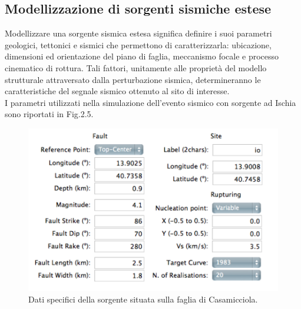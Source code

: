 \documentclass[a4paper,12pt,titlepage]{article}
\begin{document}
\subsection{Modellizzazione di sorgenti sismiche estese}

Modellizzare una sorgente sismica estesa significa definire i suoi parametri geologici, tettonici e sismici che permettono di caratterizzarla: ubicazione, dimensioni ed orientazione del piano di faglia, meccanismo focale e processo cinematico di rottura. Tali fattori, unitamente alle proprietà del modello strutturale attraversato dalla perturbazione sismica, determineranno le caratteristiche del segnale sismico ottenuto al sito di interesse.\\
I parametri utilizzati nella simulazione dell'evento sismico con sorgente ad Ischia sono riportati in Fig.2.5.

\begin{figure}[htbp]
 \centering
 \includegraphics[width=.5\linewidth]{Img/Paratmeters.png}
 \caption{Dati specifici della sorgente situata sulla faglia di Casamicciola.}
 \label{fig:Paratmeters}
\end{figure}
\end{document}
